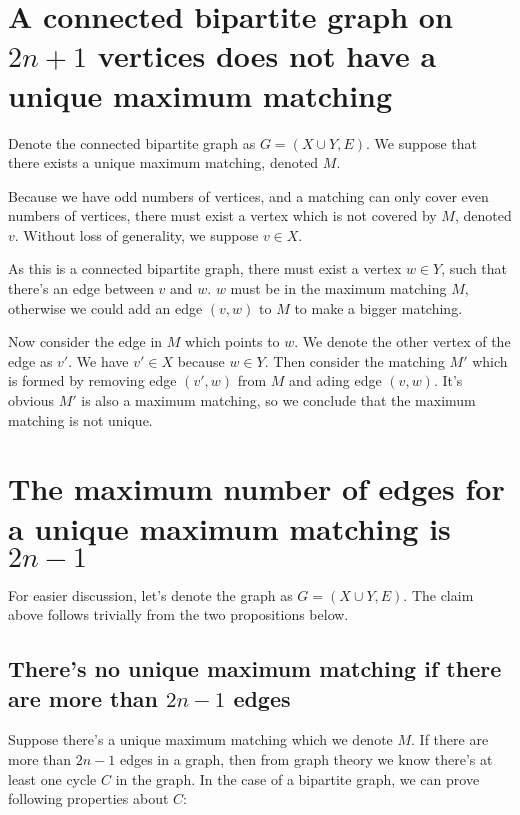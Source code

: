 
\section{A connected bipartite graph on $2n+1$ vertices does not have a unique maximum matching}

Denote the connected bipartite graph as $G = (X \cup Y, E)$. We suppose that there exists a unique maximum matching, denoted $M$.

Because we have odd numbers of vertices, and a matching can only cover even numbers of vertices, there must exist a vertex which is not covered by $M$, denoted $v$. Without loss of generality, we suppose $v \in X$.

As this is a connected bipartite graph, there must exist a vertex $w \in Y$, such that there's an edge between $v$ and $w$. $w$ must be in the maximum matching $M$, otherwise we could add an edge $(v,w)$ to $M$ to make a bigger matching.

Now consider the edge in $M$ which points to $w$. We denote the other vertex of the edge as $v'$. We have $v' \in X$ because $w \in Y$. Then consider the matching $M'$ which is formed by removing edge $(v',w)$ from $M$ and ading edge $(v, w)$. It's obvious $M'$ is also a maximum matching, so we conclude that the maximum matching is not unique.

\section{The maximum number of edges for a unique maximum matching is $2n-1$}

For easier discussion, let's denote the graph as $G = (X \cup Y, E)$. The claim above follows trivially from the two propositions below.

\subsection{There's no unique maximum matching if there are more than $2n-1$ edges}

Suppose there's a unique maximum matching which we denote $M$. If there are more than $2n-1$ edges in a graph, then from graph theory we know there's at least one cycle $C$ in the graph. In the case of a bipartite graph, we can prove following properties about $C$:

